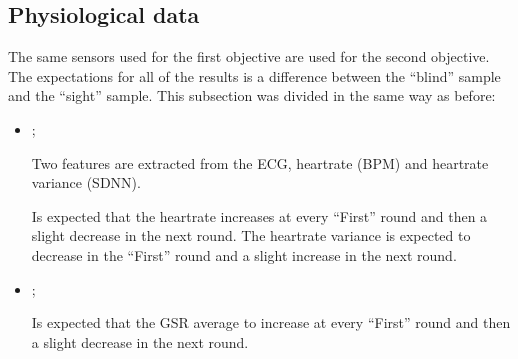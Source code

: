 \subsection{Physiological data}

The same sensors used for the first objective are used for the second objective. The expectations for all of the results is a difference between the “blind” sample and the “sight” sample. This subsection was divided in the same way as before:

\begin{itemize}
    \item {};
    
        Two features are extracted from the ECG, heartrate (BPM) and heartrate variance (SDNN).
    
        Is expected that the heartrate increases at every “First” round and then a slight decrease in the next round. The heartrate variance is expected to decrease in the “First” round and a slight increase in the next round.    

    \item {};
    
        Is expected that the GSR average to increase at every “First” round and then a slight decrease in the next round.

\end{itemize}


